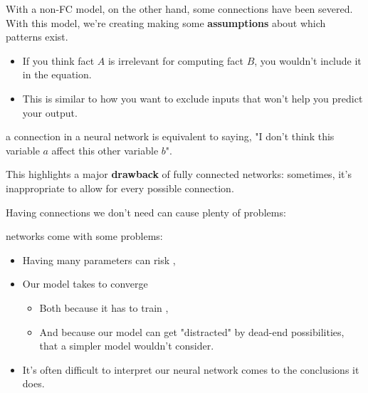         With a non-FC model, on the other hand, some connections have been severed. With this model, we're creating making some \textbf{assumptions} about which patterns  exist.
        
        \begin{itemize}
            \item \miniex If you think fact $A$ is irrelevant for computing fact $B$, you wouldn't include it in the equation.
            \item This is similar to how you want to exclude inputs that won't help you predict your output.\\
        \end{itemize}

        \begin{concept}
             a connection in a neural network is equivalent to saying, "I don't think this variable $a$  affect this other variable $b$".
        \end{concept}

        This highlights a major \textbf{drawback} of fully connected networks: sometimes, it's inappropriate to allow for every possible connection.

        Having connections we don't need can cause plenty of problems:\\

        \begin{concept}
             networks come with some problems:

            \begin{itemize}
                \item Having many parameters can risk ,
                \item Our model takes  to converge
                    \begin{itemize}
                        \item Both because it has to train ,
                        \item And because our model can get "distracted" by dead-end possibilities, that a simpler model wouldn't consider.
                    \end{itemize}
                \item It's often difficult to interpret  our neural network comes to the conclusions it does.
            \end{itemize}
        \end{concept}

